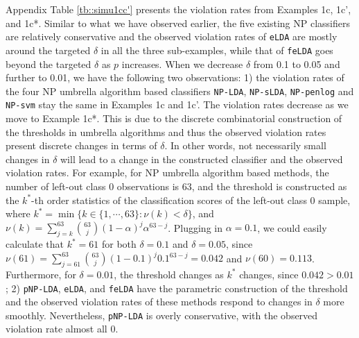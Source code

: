 \documentclass[12pt]{article}
\numberwithin{equation}{section}
\theoremstyle{remark}
\newcommand{\1}{{\rm 1}\kern-0.24em{\rm I}}
\begin{document}
Appendix Table \ref{tb::simu1cc'} presents the violation rates from Examples 1c,  1c', and 1c*. Similar to what we have observed earlier, the five existing NP classifiers are relatively conservative and the observed violation rates of \verb+eLDA+ are mostly around the targeted $\delta$ in all the three sub-examples,  while that of \verb+feLDA+ goes beyond the targeted $\delta$ as $p$ increases.  When we decrease $\delta$ from 0.1 to 0.05 and further to 0.01,  we have the following two observations: 1) the violation rates of the four NP umbrella algorithm based classifiers \verb+NP-LDA+, \verb+NP-sLDA+, \verb+NP-penlog+ and \verb+NP-svm+ stay the same in Examples 1c and 1c'.  The violation rates decrease as we move to Example 1c*.  This is due to the discrete combinatorial construction of the thresholds in umbrella algorithms and thus the observed violation rates present discrete changes in terms of $\delta$.  In other words,  not necessarily small changes in $\delta$ will lead to a change in the constructed classifier and the observed violation rates.  For example,  for NP umbrella algorithm based methods, the number of left-out class 0 observations is 63, and the threshold is constructed as the $k^*$-th order statistics of the classification scores of the left-out class 0 sample, where $k^*=\min \{ k\in\{1,\cdots, 63\}: \nu(k)< \delta\}$, and $\nu (k)=\sum_{j=k}^{63}  {63 \choose j} (1-\alpha)^j \alpha^{63-j}$.  Plugging in $\alpha=0.1$,  we could easily calculate that $k^*=61$ for both $\delta=0.1$ and $\delta=0.05$, since $\nu (61)=\sum_{j=61}^{63}  {63 \choose j} (1-0.1)^j 0.1^{63-j}= 0.042$ and $\nu (60)= 0.113$. Furthermore, for $\delta = 0.01$,  the threshold changes as $k^*$ changes, since $0.042>0.01$; 2) \verb+pNP-LDA+, \verb+eLDA+, and \verb+feLDA+ have the parametric construction of the threshold and the observed violation rates of these methods respond to changes in $\delta$ more smoothly.  Nevertheless,  \verb+pNP-LDA+ is overly conservative,  with the observed violation rate almost all 0. %
\end{document}
